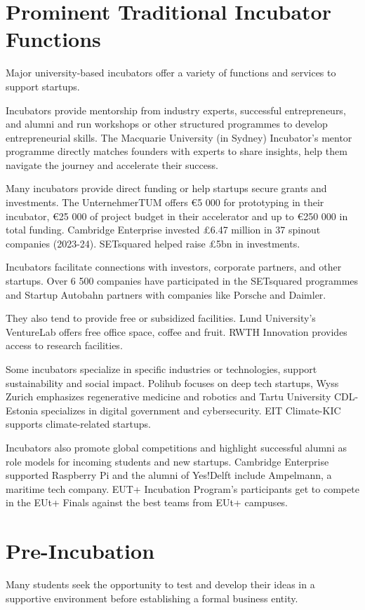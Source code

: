 \section{Prominent Traditional Incubator Functions}
Major university-based incubators offer a variety of functions and services to support startups.

Incubators provide mentorship from industry experts, successful entrepreneurs, and alumni and run workshops or other structured programmes to develop entrepreneurial skills. The Macquarie University (in Sydney)
Incubator’s mentor programme directly matches founders with experts to share insights, help them navigate the journey and accelerate their success. 

Many incubators provide direct funding or help startups secure grants and investments. The UnternehmerTUM offers €5 000 for prototyping in their incubator, €25 000 of project budget in their accelerator and up to €250 000 in total funding. Cambridge Enterprise invested £6.47 million in 37 spinout companies (2023-24). SETsquared helped raise £5bn in investments.

Incubators facilitate connections with investors, corporate partners, and other startups. Over 6 500 companies have participated in the SETsquared programmes and Startup Autobahn partners with companies like Porsche and Daimler.

They also tend to provide free or subsidized facilities. Lund University’s VentureLab offers free office space, coffee and fruit. RWTH Innovation provides access to research facilities. 

Some incubators specialize in specific industries or technologies, support sustainability and social impact. Polihub focuses on deep tech startups, Wyss Zurich emphasizes regenerative medicine and robotics and Tartu University CDL-Estonia specializes in digital government and cybersecurity. EIT Climate-KIC supports climate-related startups.

Incubators also promote global competitions and highlight successful alumni as role models for incoming students and new startups. Cambridge Enterprise supported Raspberry Pi and the alumni of Yes!Delft include Ampelmann, a maritime tech company. EUT+ Incubation Program’s participants get to compete in the EUt+ Finals against the best teams from EUt+ campuses.

\section{Pre-Incubation}
Many students seek the opportunity to test and develop their ideas in a supportive environment before establishing a formal business entity.

